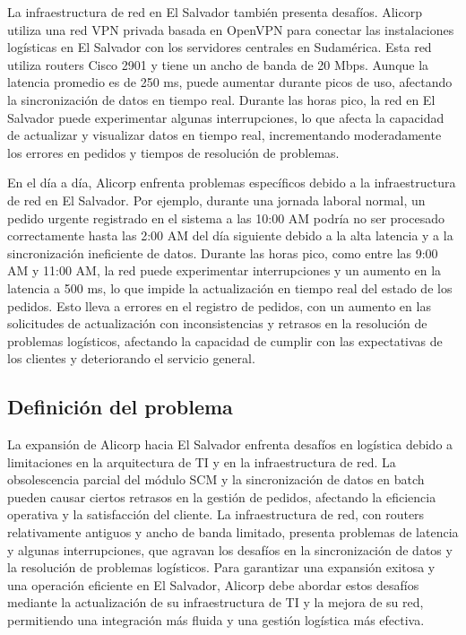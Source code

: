 La infraestructura de red en El Salvador también presenta desafíos. Alicorp utiliza una red VPN privada basada en OpenVPN para conectar las instalaciones logísticas en El Salvador con los servidores centrales en Sudamérica. Esta red utiliza routers Cisco 2901 y tiene un ancho de banda de 20 Mbps. Aunque la latencia promedio es de 250 ms, puede aumentar durante picos de uso, afectando la sincronización de datos en tiempo real. Durante las horas pico, la red en El Salvador puede experimentar algunas interrupciones, lo que afecta la capacidad de actualizar y visualizar datos en tiempo real, incrementando moderadamente los errores en pedidos y tiempos de resolución de problemas.

En el día a día, Alicorp enfrenta problemas específicos debido a la infraestructura de red en El Salvador. Por ejemplo, durante una jornada laboral normal, un pedido urgente registrado en el sistema a las 10:00 AM podría no ser procesado correctamente hasta las 2:00 AM del día siguiente debido a la alta latencia y a la sincronización ineficiente de datos. Durante las horas pico, como entre las 9:00 AM y 11:00 AM, la red puede experimentar interrupciones y un aumento en la latencia a 500 ms, lo que impide la actualización en tiempo real del estado de los pedidos. Esto lleva a errores en el registro de pedidos, con un aumento en las solicitudes de actualización con inconsistencias y retrasos en la resolución de problemas logísticos, afectando la capacidad de cumplir con las expectativas de los clientes y deteriorando el servicio general.

\subsection{Definición del problema}

La expansión de Alicorp hacia El Salvador enfrenta desafíos en logística debido a limitaciones en la arquitectura de TI y en la infraestructura de red. La obsolescencia parcial del módulo SCM y la sincronización de datos en batch pueden causar ciertos retrasos en la gestión de pedidos, afectando la eficiencia operativa y la satisfacción del cliente. La infraestructura de red, con routers relativamente antiguos y ancho de banda limitado, presenta problemas de latencia y algunas interrupciones, que agravan los desafíos en la sincronización de datos y la resolución de problemas logísticos. Para garantizar una expansión exitosa y una operación eficiente en El Salvador, Alicorp debe abordar estos desafíos mediante la actualización de su infraestructura de TI y la mejora de su red, permitiendo una integración más fluida y una gestión logística más efectiva.